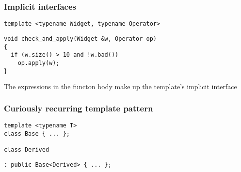 \documentclass[14pt,a4paper,dvipsnames,usenames]{beamer}
\begin{document}
\begin{frame}[fragile]
  \frametitle{Implicit interfaces}

  \begin{lstlisting}[deletekeywords={Widget}]
template <typename Widget, typename Operator>
  \end{lstlisting}
  \vspace*{-.4cm}
  \begin{lstlisting}[morekeywords={Operator}]
void check_and_apply(Widget &w, Operator op)
{
  if (w.size() > 10 and !w.bad())
    op.apply(w);
}
  \end{lstlisting}

  \vspace{.5cm}
  The expressions in the functon body make up the template's implicit interface

  
\end{frame}

\begin{frame}[fragile]
  \frametitle{Curiously recurring template pattern}

  \begin{lstlisting}[basicstyle=\ttfamily]
template <typename T>
class Base { ... };

class Derived
  \end{lstlisting}
  \vspace*{-.4cm}
  \begin{lstlisting}[basicstyle=\ttfamily,morekeywords={Base,Derived}]
  : public Base<Derived> { ... };
  \end{lstlisting}
  
\end{frame}
\end{document}
